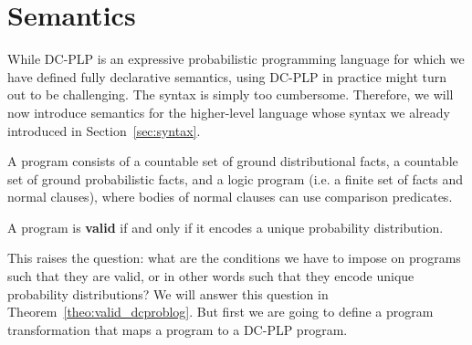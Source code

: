 \section{\dcproblogsty Semantics}\label{sec:dcproblog}
While DC-PLP is an expressive probabilistic programming language for which we have defined fully declarative semantics, using DC-PLP in practice might turn out to be challenging. The syntax is simply too cumbersome. Therefore, we will now introduce semantics for the higher-level \dcproblogsty language whose syntax we already introduced in Section~\ref{sec:syntax}.




A \dcproblogsty program consists of a countable set of ground distributional facts, a countable set of ground probabilistic facts, and a logic program (i.e. a finite set of facts and normal clauses), where bodies of normal clauses can use comparison predicates.   


\begin{definition} A \dcproblogsty program \dcpprogram is {\bf valid} if and only if it encodes a unique probability distribution.
\end{definition} 

This raises the question: what are the conditions we have to impose on \dcproblogsty programs such that they are valid, or in other words such that they encode unique probability distributions? We will answer this question in Theorem~\ref{theo:valid_dcproblog}. But first we are going to define a program transformation that maps a \dcproblogsty program to a DC-PLP program.  





\begin{definition} \label{def:dcproblog2dcplp}




\end{definition}

